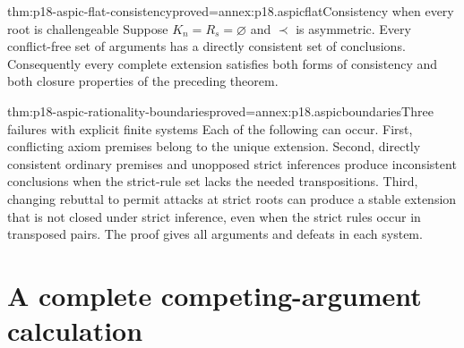 \begin{hbtheorem}{thm:p18-aspic-flat-consistency}{proved=annex:p18.aspicflat}{Consistency when every root is challengeable}
Suppose \(K_n=R_s=\varnothing\) and \(\prec\) is asymmetric.
Every conflict-free set of arguments has a directly consistent set of
conclusions. Consequently every complete extension satisfies both forms
of consistency and both closure properties of the preceding theorem.
\end{hbtheorem}

\begin{hbtheorem}{thm:p18-aspic-rationality-boundaries}{proved=annex:p18.aspicboundaries}{Three failures with explicit finite systems}
Each of the following can occur.
First, conflicting axiom premises belong to the unique extension.
Second, directly consistent ordinary premises and unopposed strict
inferences produce inconsistent conclusions when the strict-rule set
lacks the needed transpositions.
Third, changing rebuttal to permit attacks at strict roots can produce a
stable extension that is not closed under strict inference, even when
the strict rules occur in transposed pairs.
The proof gives all arguments and defeats in each system.
\end{hbtheorem}

\section{A complete competing-argument calculation}

